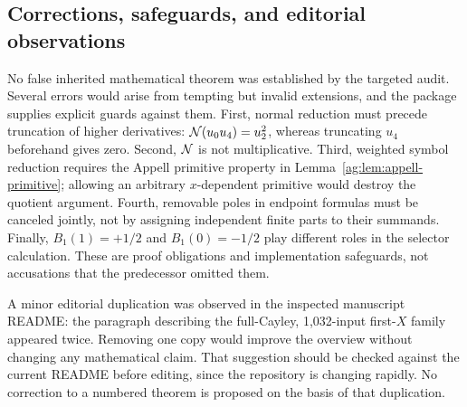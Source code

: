 \documentclass[11pt,letterpaper]{article}
\numberwithin{equation}{section}
\theoremstyle{definition}\newtheorem{definition}[theorem]{Definition}
\theoremstyle{remark}\newtheorem{remark}[theorem]{Remark}
\begin{document}
\subsection{Corrections, safeguards, and editorial observations}
No false inherited mathematical theorem was established by the targeted
audit. Several errors would arise from tempting but invalid extensions,
and the package supplies explicit guards against them.
First, normal reduction must precede truncation of higher derivatives:
$\mathcal N(u_0u_4)=u_2^2$, whereas truncating $u_4$ beforehand gives zero.
Second, $\mathcal N$ is not multiplicative. Third, weighted symbol reduction
requires the Appell primitive property in
Lemma~\ref{ag:lem:appell-primitive}; allowing an arbitrary
$x$-dependent primitive would destroy the quotient argument. Fourth,
removable poles in endpoint formulas must be canceled jointly, not
by assigning independent finite parts to their summands. Finally,
$B_1(1)=+1/2$ and $B_1(0)=-1/2$ play different roles in the selector
calculation. These are proof obligations and implementation safeguards,
not accusations that the predecessor omitted them.

A minor editorial duplication was observed in the inspected manuscript
README: the paragraph describing the full-Cayley, 1,032-input first-$X$
family appeared twice. Removing one copy would improve the overview
without changing any mathematical claim. That suggestion should be
checked against the current README before editing, since the repository
is changing rapidly. No correction to a numbered theorem is proposed
on the basis of that duplication.
\end{document}

